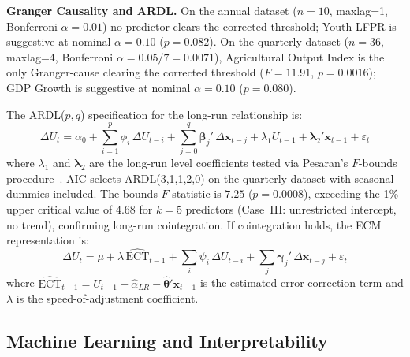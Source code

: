 \documentclass[sigconf]{acmart}
\begin{document}
\textbf{Granger Causality and ARDL.} On the annual dataset ($n{=}10$,
maxlag=1, Bonferroni $\alpha{=}0.01$) no predictor clears the corrected
threshold; Youth LFPR is suggestive at nominal $\alpha{=}0.10$
($p{=}0.082$). On the quarterly dataset ($n{=}36$, maxlag=4, Bonferroni
$\alpha{=}0.05/7{=}0.0071$), Agricultural Output Index is the only
Granger-cause clearing the corrected threshold ($F{=}11.91$, $p{=}0.0016$);
GDP Growth is suggestive at nominal $\alpha{=}0.10$ ($p{=}0.080$).

The ARDL($p,q$) specification for the long-run relationship is:
%
\begin{equation}
  \Delta U_t = \alpha_0
    + \sum_{i=1}^{p}\phi_i\,\Delta U_{t-i}
    + \sum_{j=0}^{q}\boldsymbol{\beta}_j'\,\Delta\mathbf{x}_{t-j}
    + \lambda_1 U_{t-1}
    + \boldsymbol{\lambda}_2'\mathbf{x}_{t-1}
    + \varepsilon_t
  \label{eq:ardl}
\end{equation}
%
where $\lambda_1$ and $\boldsymbol{\lambda}_2$ are the long-run level
coefficients tested via Pesaran's $F$-bounds procedure~\cite{pesaran2001}.
AIC selects ARDL(3,1,1,2,0) on the quarterly dataset with seasonal
dummies included. The bounds $F$-statistic is $7.25$ ($p{=}0.0008$),
exceeding the 1\% upper critical value of $4.68$ for $k{=}5$ predictors
(Case~III: unrestricted intercept, no trend), confirming long-run
cointegration. If cointegration holds, the ECM representation is:
%
\begin{equation}
  \Delta U_t = \mu + \lambda\,\widehat{\text{ECT}}_{t-1}
    + \sum_{i}\psi_i\,\Delta U_{t-i}
    + \sum_{j}\boldsymbol{\gamma}_j'\,\Delta\mathbf{x}_{t-j}
    + \varepsilon_t
  \label{eq:ecm}
\end{equation}
%
where $\widehat{\text{ECT}}_{t-1} = U_{t-1} - \hat\alpha_{LR}
- \hat{\boldsymbol{\theta}}'\mathbf{x}_{t-1}$ is the estimated error
correction term and $\lambda$ is the speed-of-adjustment coefficient.

\subsection{Machine Learning and Interpretability}
\end{document}
